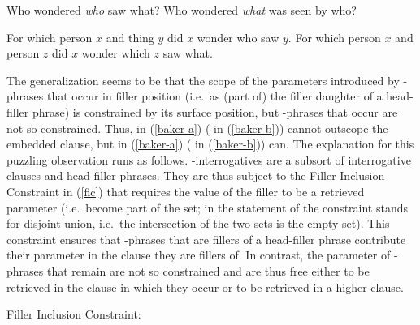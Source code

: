 \documentclass[output=paper
 	        ,biblatex
                ,babelshorthands
                ,newtxmath
                ,draftmode
                ,colorlinks, citecolor=brown
]{langscibook}
\begin{document}
\begin{exe}
\ex\label{baker-exs}
\begin{xlist}
\ex\label{baker-a} Who wondered \emph{who} saw what?
\ex\label{baker-b} Who wondered \emph{what} was seen by who?
\end{xlist}
\ex\label{baker-sem}
\begin{xlist}
\ex\label{baker-sem-a}For which person $x$ and thing $y$ did $x$ wonder who saw $y$.
\ex\label{baker-sem-b}For which person $x$ and person $z$ did $x$ wonder which $z$ saw what.
\end{xlist}
\end{exe}

The generalization seems to be that the scope of the parameters  introduced by -phrases that occur in filler position (i.e.\ as (part of) the filler daughter of a head-filler phrase) is constrained by its surface position, but -phrases that occur  are not so constrained. Thus,  in (\ref{baker-a})  ( in (\ref{baker-b})) cannot outscope the embedded clause, but  in (\ref{baker-a}) ( in (\ref{baker-b})) can.
The explanation for this puzzling observation runs as follows. -interrogatives are a subsort of interrogative clauses and head-filler phrases. They are thus subject to the Filler-Inclusion Constraint in (\ref{fic}) that requires the  value of the filler to be a retrieved parameter (i.e.\ become part of the  set; \isi{$\uplus$} in the statement of the constraint stands for disjoint union, i.e.\ the intersection of the two sets is the empty set). 
This constraint ensures that -phrases that are fillers of a head-filler phrase contribute their parameter in the clause they are fillers of. In contrast, the parameter of -phrases that remain  are not so constrained and are thus free either to be retrieved in the clause in which they occur or to be retrieved in a higher clause. 

\begin{exe}
\ex\label{fic}Filler Inclusion Constraint:\\
\end{exe}
\end{document}
